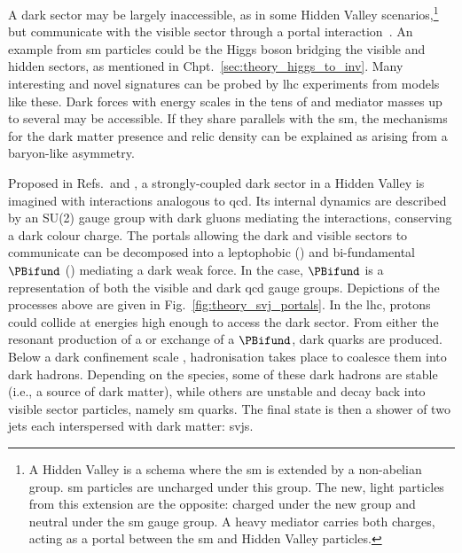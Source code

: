 A dark sector may be largely inaccessible, as in some Hidden Valley scenarios,\footnote{A Hidden Valley is a schema where the \acrlong{sm} is extended by a non-abelian group. \acrshort{sm} particles are uncharged under this group. The new, light particles from this extension are the opposite: charged under the new group and neutral under the \acrshort{sm} gauge group. A heavy mediator carries both charges, acting as a portal between the \acrlong{sm} and Hidden Valley particles.} but communicate with the visible sector through a portal interaction~\cite{Strassler:2006im}. An example from \acrshort{sm} particles could be the Higgs boson bridging the visible and hidden sectors, as mentioned in Chpt.~\ref{sec:theory_higgs_to_inv}. Many interesting and novel signatures can be probed by \acrshort{lhc} experiments from models like these. Dark forces with energy scales in the tens of \GeVns and mediator masses up to several \TeVns may be accessible. If they share parallels with the \acrlong{sm}, the mechanisms for the dark matter presence and relic density can be explained as arising from a baryon-like asymmetry.

Proposed in Refs.~and , a strongly-coupled dark sector in a Hidden Valley is imagined with interactions analogous to \acrshort{qcd}. Its internal dynamics are described by an SU(2) gauge group with dark gluons mediating the interactions, conserving a dark colour charge. The portals allowing the dark and visible sectors to communicate can be decomposed into a leptophobic \PZprime (\schannel) and bi-fundamental $\PBifund$ (\tchannel) mediating a dark weak force. In the \tchannel case, $\PBifund$ is a representation of both the visible and dark \acrshort{qcd} gauge groups. Depictions of the processes above are given in Fig.~\ref{fig:theory_svj_portals}. In the \acrshort{lhc}, protons could collide at energies high enough to access the dark sector. From either the resonant production of a \PZprime or exchange of a $\PBifund$, dark quarks \Pqdark are produced. Below a dark confinement scale \lamDark, hadronisation takes place to coalesce them into dark hadrons. Depending on the species, some of these dark hadrons are stable (i.e., a source of dark matter), while others are unstable and decay back into visible sector particles, namely \acrlong{sm} quarks. The final state is then a shower of two \glspl{jet} each interspersed with dark matter: \glspl{svj}.

